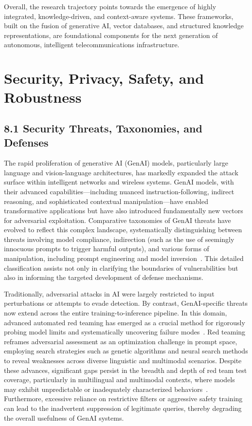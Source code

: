\documentclass[sigconf]{acmart}
\begin{document}
Overall, the research trajectory points towards the emergence of highly integrated, knowledge-driven, and context-aware systems. These frameworks, built on the fusion of generative AI, vector databases, and structured knowledge representations, are foundational components for the next generation of autonomous, intelligent telecommunications infrastructure.

\section{Security, Privacy, Safety, and Robustness}

\subsection{8.1 Security Threats, Taxonomies, and Defenses}

The rapid proliferation of generative AI (GenAI) models, particularly large language and vision-language architectures, has markedly expanded the attack surface within intelligent networks and wireless systems. GenAI models, with their advanced capabilities—including nuanced instruction-following, indirect reasoning, and sophisticated contextual manipulation—have enabled transformative applications but have also introduced fundamentally new vectors for adversarial exploitation. Comparative taxonomies of GenAI threats have evolved to reflect this complex landscape, systematically distinguishing between threats involving model compliance, indirection (such as the use of seemingly innocuous prompts to trigger harmful outputs), and various forms of manipulation, including prompt engineering and model inversion~\cite{ref3}. This detailed classification assists not only in clarifying the boundaries of vulnerabilities but also in informing the targeted development of defense mechanisms.

Traditionally, adversarial attacks in AI were largely restricted to input perturbations or attempts to evade detection. By contrast, GenAI-specific threats now extend across the entire training-to-inference pipeline. In this domain, advanced automated red teaming has emerged as a crucial method for rigorously probing model limits and systematically uncovering failure modes~\cite{ref3}. Red teaming reframes adversarial assessment as an optimization challenge in prompt space, employing search strategies such as genetic algorithms and neural search methods to reveal weaknesses across diverse linguistic and multimodal scenarios. Despite these advances, significant gaps persist in the breadth and depth of red team test coverage, particularly in multilingual and multimodal contexts, where models may exhibit unpredictable or inadequately characterized behaviors~\cite{ref3}. Furthermore, excessive reliance on restrictive filters or aggressive safety training can lead to the inadvertent suppression of legitimate queries, thereby degrading the overall usefulness of GenAI systems.
\end{document}
